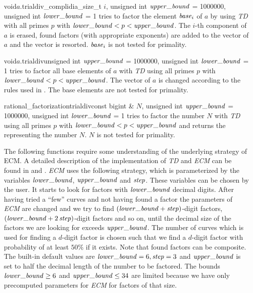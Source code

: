 

\begin{fcode}{void}{$a$.trialdiv_comp}{lidia_size_t $i$, unsigned int $\upperbound$ = 1000000,
    unsigned int $\lowerbound$ = 1}%
  tries to factor the element $\mathit{base}_i$ of $a$ by using \emph{TD} with all primes $p$ with
  $\lowerbound < p < \upperbound$.  The $i$-th component of $a$ is erased, found factors (with
  appropriate exponents) are added to the vector of $a$ and the vector is resorted.  $\mathit{base}_i$
  is not tested for primality.
\end{fcode}

\begin{fcode}{void}{$a$.trialdiv}{unsigned int $\upperbound$ = 1000000, unsigned int $\lowerbound$ = 1}
  tries to factor all base elements of $a$ with \emph{TD} using all primes $p$ with $\lowerbound
  < p < \upperbound$.  The vector of $a$ is changed according to the rules used in
  .  The base elements are not tested for primality.
\end{fcode}

\begin{fcode}{rational_factorization}{trialdiv}{const bigint & $N$,
    unsigned int $\upperbound$ = 1000000, unsigned int $\lowerbound$ = 1}%
  tries to factor the number $N$ with \emph{TD} using all primes $p$ with $\lowerbound < p <
  \upperbound$ and returns the  representing the number $N$.  $N$
  is not tested for primality.
\end{fcode}

The following functions require some understanding of the underlying strategy of ECM.  A
detailed description of the implementation of \emph{TD} and \emph{ECM} can be found in
\cite{Berger_Thesis:1993} and \cite{Mueller_Thesis:1995}.  \emph{ECM} uses the following
strategy, which is parameterized by the  variables $\lowerbound$, $\upperbound$ and
$\mathit{step}$.  These variables can be chosen by the user.  It starts to look for factors with
$\lowerbound$ decimal digits.  After having tried a ``few'' curves and not having found a factor
the parameters of \emph{ECM} are changed and we try to find $(\lowerbound + \step)$-digit
factors, $(\lowerbound + 2\,\step)$-digit factors and so on, until the decimal size of the
factors we are looking for exceeds $\upperbound$.  The number of curves which is used for
finding a $d$-digit factor is chosen such that we find a $d$-digit factor with probability of at
least $50 \%$ if it exists.  Note that found factors can be composite.  The built-in default
values are $\lowerbound = 6, \step = 3$ and $\upperbound$ is set to half the decimal length of
the number to be factored.  The bounds $\lowerbound \geq 6$ and $\upperbound \leq 34$ are
limited because we have only precomputed parameters for \emph{ECM} for factors of that size.

